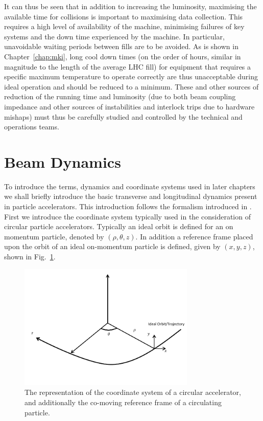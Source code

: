 It can thus be seen that in addition to increasing the luminosity, maximising the available time for collisions is important to maximising data collection. This requires a high level of availability of the machine, minimising failures of key systems and the down time experienced by the machine. In particular, unavoidable waiting periods between fills are to be avoided. As is shown in Chapter~\ref{chap:mki}, long cool down times (on the order of hours, similar in magnitude to the length of the average LHC fill) for equipment that requires a specific maximum temperature to operate correctly are thus unacceptable during ideal operation and should be reduced to a minimum. These and other sources of reduction of the running time and luminosity (due to both beam coupling impedance and other sources of instabilities and interlock trips due to hardware mishaps) must thus be carefully studied and controlled by the technical and operations teams.

\section{Beam Dynamics}

To introduce the terms, dynamics and coordinate systems used in later chapters we shall briefly introduce the basic transverse and longitudinal dynamics present in particle accelerators. This introduction follows the formalism introduced in \cite{Holzer:TransDyn}. First we introduce the coordinate system typically used in the consideration of circular particle accelerators. Typically an ideal orbit is defined for an on momentum particle, denoted by $(\rho, \theta, z)$. In addition a reference frame placed upon the orbit of an ideal on-momentum particle is defined, given by $(x, y, z)$, shown in Fig.~\ref{fig:accel-coord-system}. 

\begin{figure}
\begin{center}
\includegraphics[width=0.75\textwidth]{Introduction/figures/coordinate-system.pdf}
\end{center}
\label{fig:accel-coord-system}
\caption{The representation of the coordinate system of a circular accelerator, and additionally the co-moving reference frame of a circulating particle.}
\end{figure}

